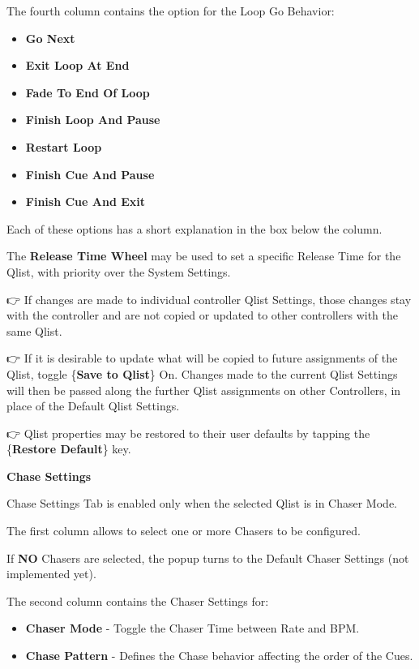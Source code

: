 \documentclass[
]{article}
\begin{document}
The fourth column contains the option for the Loop Go Behavior:

\begin{itemize}
\item
  \textbf{Go Next}
\item
  \textbf{Exit Loop At End}
\item
  \textbf{Fade To End Of Loop}
\item
  \textbf{Finish Loop And Pause}
\item
  \textbf{Restart Loop}
\item
  \textbf{Finish Cue And Pause}
\item
  \textbf{Finish Cue And Exit}
\end{itemize}

Each of these options has a short explanation in the box below the column.

The \textbf{Release Time Wheel} may be used to set a specific Release Time for the Qlist, with priority over the System Settings.

👉 If changes are made to individual controller Qlist Settings, those changes stay with the controller and are not copied or updated to other controllers with the same Qlist.

👉 If it is desirable to update what will be copied to future assignments of the Qlist, toggle \{\textbf{Save to Qlist}\} On. Changes made to the current Qlist Settings will then be passed along the further Qlist assignments on other Controllers, in place of the Default Qlist Settings.

👉 Qlist properties may be restored to their user defaults by tapping the \{\textbf{Restore Default}\} key.

\textbf{Chase Settings}

Chase Settings Tab is enabled only when the selected Qlist is in Chaser Mode.

The first column allows to select one or more Chasers to be configured.

If \textbf{NO} Chasers are selected, the popup turns to the Default Chaser Settings (not implemented yet).

The second column contains the Chaser Settings for:

\begin{itemize}
\item
  \textbf{Chaser Mode} - Toggle the Chaser Time between Rate and BPM.
\item
  \textbf{Chase Pattern} - Defines the Chase behavior affecting the order of the Cues.
\end{itemize}
\end{document}
